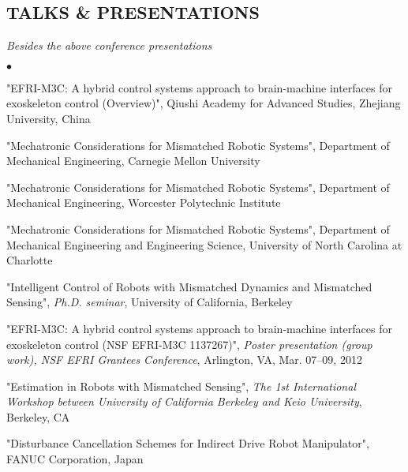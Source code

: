 \documentclass{res}
\begin{document}
\begin{resume}
\section{TALKS \& PRESENTATIONS}
{\it Besides the above conference presentations}
\begin{list}{$\bullet$}{\setlength\leftmargin{0in}\setlength\topsep{0in}}
\item {} "EFRI-M3C: A hybrid control systems approach to brain-machine interfaces for exoskeleton control (Overview)", Qiushi Academy for Advanced Studies, Zhejiang University, China
\item {} "Mechatronic Considerations for Mismatched Robotic Systems", Department of Mechanical Engineering, Carnegie Mellon University
\item {} "Mechatronic Considerations for Mismatched Robotic Systems", Department of Mechanical Engineering, Worcester Polytechnic Institute
\item {} "Mechatronic Considerations for Mismatched Robotic Systems", Department of Mechanical Engineering and Engineering Science, University of North Carolina at Charlotte
\item {} "Intelligent Control of Robots with Mismatched Dynamics and Mismatched Sensing", \emph{Ph.D. seminar}, University of California, Berkeley
\item {} "EFRI-M3C: A hybrid control systems approach to brain-machine interfaces for exoskeleton control (NSF EFRI-M3C 1137267)", \emph{Poster presentation (group work), NSF EFRI Grantees Conference}, Arlington, VA, Mar. 07--09, 2012
\item {} "Estimation in Robots with Mismatched Sensing", \emph{The 1st International Workshop between University of California Berkeley and Keio University}, Berkeley, CA
\item {} "Disturbance Cancellation Schemes for Indirect Drive Robot Manipulator", FANUC Corporation, Japan
\end{list}


\end{resume}
\end{document}
